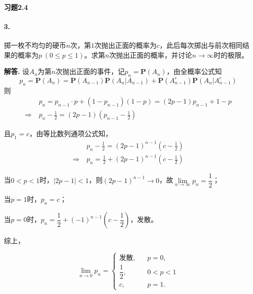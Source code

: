 \documentclass[12pt, a4paper, oneside]{ctexart}
\newenvironment{solution}{\par\noindent\textbf{解答. }}{\bigskip\par}
\begin{document}
\paragraph{习题2.4}
\paragraph{3.}掷一枚不均匀的硬币$n$次，第$1$次抛出正面的概率为$c$，此后每次掷出与前次相同结果的概率为$p\ (0\leqslant p\leqslant 1)$。求第$n$次抛出正面的概率，并讨论$n\rightarrow \infty$时的极限。
\begin{solution}
    设$A_n$为第$n$次抛出正面的事件，记$p_n = \textbf{P}(A_n)$，由全概率公式知
    \begin{equation*}
        p_n = \textbf{P}(A_n) = \textbf{P}(A_{n-1})\textbf{P}(A_n|A_{n-1})+\textbf{P}(A_{n-1}^c)\textbf{P}(A_n|A_{n-1}^c)
    \end{equation*}
    则
    \begin{equation*}
        \begin{aligned}
            &\ p_n = p_{n-1}\cdot p+(1-p_{n-1})(1-p) = (2p-1)p_{n-1}+1-p\\
            \Rightarrow&\ p_n-\frac{1}{2} = (2p-1)(p_{n-1}-\frac{1}{2})
        \end{aligned}
    \end{equation*}

    且$p_1 = c$，由等比数列通项公式知，
    \begin{equation*}
        \begin{aligned}
            &\ p_n-\frac{1}{2}=(2p-1)^{n-1}(c-\frac{1}{2})\\
            \Rightarrow &\ p_n=\frac{1}{2}+(2p-1)^{n-1}(c-\frac{1}{2})
        \end{aligned}
    \end{equation*}

    当$0<p<1$时，$|2p-1| < 1$，则$(2p-1)^{n-1}\rightarrow 0$，故$\lim\limits_{n\rightarrow \infty}p_n=\dfrac{1}{2}$；

    当$p=1$时，$p_n = c$；

    当$p=0$时，$p_n = \dfrac{1}{2} + (-1)^{n-1}(c-\dfrac{1}{2})$，发散。

    综上，

    \begin{equation*}
        \lim_{n\rightarrow 0}p_n = \begin{cases}
            \text{发散}, &\quad p=0,\\
            \dfrac{1}{2}, &\quad 0<p<1\\
            c, &\quad p=1.
        \end{cases}
    \end{equation*}
\end{solution}
\end{document}
